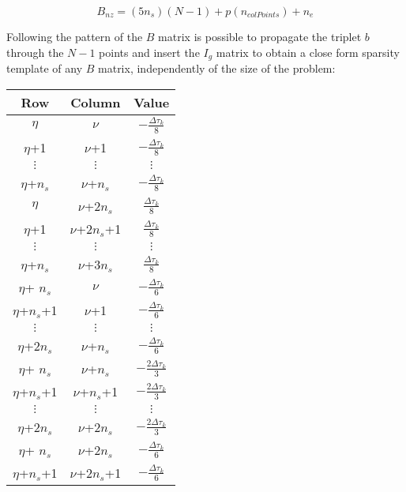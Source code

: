 \documentclass[12pt]{article}
\begin{document}
\begin{equation}
    B_{nz}=(5n_s)(N-1)+p(n_{colPoints})+n_e
\end{equation}

Following the pattern of the $B$ matrix is possible to propagate the triplet $b$ through the $N-1$ points and insert the $I_g$ matrix to obtain a close form sparsity template of any $B$ matrix, independently of the size of the problem:

\newpage

\begin{table}[h]
\begin{center}
\begin{tabular}{c|c|c}
Row    & Column        & Value \\ \hline
$\eta$      & $\nu$             & $-\frac{\Delta \tau_k}{8}$    \\
$\eta$+1    & $\nu$+1           & $-\frac{\Delta \tau_k}{8}$    \\
$\vdots$ & $\vdots$   &    $\vdots$     \\
$\eta$+$n_s$ & $\nu$+$n_s$        & $-\frac{\Delta \tau_k}{8}$    \\
%
$\eta$      & $\nu$+$2n_s$  & $\frac{\Delta \tau_k}{8}$     \\
$\eta$+1    & $\nu$+$2n_s$+1 & $\frac{\Delta \tau_k}{8}$     \\
 $\vdots$ & $\vdots$     &    $\vdots$     \\
$\eta$+$n_s$ & $\nu$+$3n_s$  & $\frac{\Delta \tau_k}{8}$\\
%
$\eta$+ $n_s$      & $\nu$             & $-\frac{\Delta \tau_k}{6}$    \\
$\eta$+$n_s$+1    & $\nu$+1           & $-\frac{\Delta \tau_k}{6}$    \\
$\vdots$ & $\vdots$   &    $\vdots$     \\
$\eta$+$2n_s$ & $\nu$+$n_s$        & $-\frac{\Delta \tau_k}{6}$    \\
%
$\eta$+ $n_s$      & $\nu$+$n_s$             & $-\frac{2\Delta \tau_k}{3}$    \\
$\eta$+$n_s$+1    & $\nu$+$n_s$+1           & $-\frac{2\Delta \tau_k}{3}$    \\
$\vdots$ & $\vdots$   &    $\vdots$     \\
$\eta$+$2n_s$ & $\nu$+$2n_s$        & $-\frac{2\Delta \tau_k}{3}$    \\
%
$\eta$+ $n_s$      & $\nu$+$2n_s$             & $-\frac{\Delta \tau_k}{6}$    \\
$\eta$+$n_s$+1    & $\nu$+$2n_s$+1           & $-\frac{\Delta \tau_k}{6}$    \\

\end{tabular}
\end{center}
\end{table}
\end{document}
